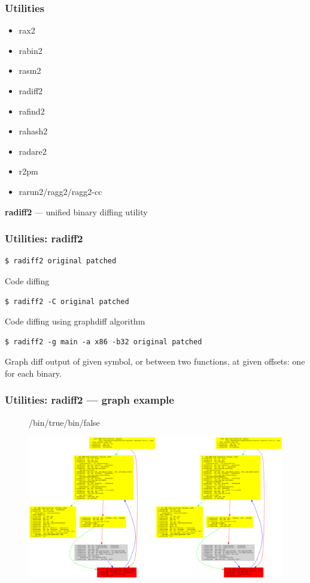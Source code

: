 \documentclass[10pt,pdf,utf8,english,compress,hyperref={unicode}]{beamer}
\begin{document}
\begin{frame}[fragile]
  \frametitle{Utilities}
     \begin{itemize}
        \item rax2
        \item rabin2
        \item rasm2
        \item \alert{radiff2}
        \item rafind2
        \item rahash2
        \item radare2
				\item r2pm
        \item rarun2/ragg2/ragg2-cc
      \end{itemize}
\end{frame}

\begin{frame}[fragile]
  \center\textbf{radiff2} — unified binary diffing utility
  \noindent\makebox[\linewidth]{\rule{\paperwidth}{0.4pt}}
  \frametitle{Utilities: radiff2}
  \begin{verbatim}$ radiff2 original patched\end{verbatim}
  \alert{Code diffing}
  \begin{verbatim}$ radiff2 -C original patched\end{verbatim}
  \alert{Code diffing using graphdiff algorithm}
  \begin{verbatim}$ radiff2 -g main -a x86 -b32 original patched\end{verbatim}
  \alert{Graph diff output of given symbol, or between two functions, at given offsets: one for each binary.}

\end{frame}

\begin{frame}[fragile]
\frametitle{Utilities: radiff2 — graph example}
  \begin{figure}
\begin{center}/bin/true\hfill /bin/false\end{center}
  \includegraphics[width=\textwidth]{radiff2.png}
  \end{figure}
\end{frame}
\end{document}
